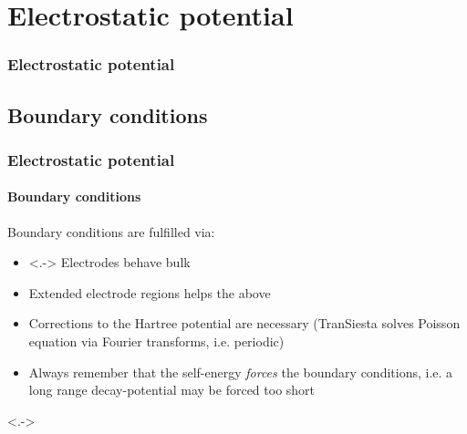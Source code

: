 \section{Electrostatic potential}

\begin{framenologo}
  \frametitle{Electrostatic potential}
  \tableofcontents[currentsection]
\end{framenologo}

\subsection{Boundary conditions}

\begin{frame}
  \frametitle{Electrostatic potential}
  \framesubtitle{Boundary conditions}

  Boundary conditions are fulfilled via:
  \begin{itemize}[<+->]
    \item<.-> Electrodes behave bulk

    \item Extended electrode regions helps the above

    \item Corrections to the Hartree potential are necessary (TranSiesta solves Poisson
    equation via Fourier transforms, i.e. periodic)

    \item Always remember that the self-energy \emph{forces} the boundary conditions,
    i.e. a long range decay-potential may be forced too short

  \end{itemize}

  \uncover<.->{
  \begin{center}

\end{center}}
\end{frame}
